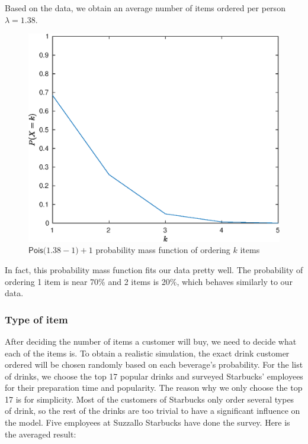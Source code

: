 \documentclass[a4paper]{article}
\newcommand{\pois}[1]{\mathsf{Pois(}{#1}\mathsf{)}}
\begin{document}
Based on the data, we obtain an average number of items ordered per person $\lambda=1.38$.

\begin{figure}[H]
	\centering
	\includegraphics[width=0.35\textheight]{pois_dist}
	\caption{$\pois{1.38-1}+1$ probability mass function of ordering $k$ items}
\end{figure}

In fact, this probability mass function fits our data pretty well. The probability of ordering 1 item is near 70\% and 2 items is 20\%, which behaves similarly to our data.

\subsubsection{Type of item}

After deciding the number of items a customer will buy, we need to decide what each of the items is. To obtain a realistic simulation, the exact drink customer ordered will be chosen randomly based on each beverage's probability. For the list of drinks, we choose the top 17 popular drinks and surveyed Starbucks' employees for their preparation time and popularity. The reason why we only choose the top 17 is for simplicity. Most of the customers of Starbucks only order several types of drink, so the rest of the drinks are too trivial to have a significant influence on the model. Five employees at Suzzallo Starbucks have done the survey. Here is the averaged result:
\end{document}
